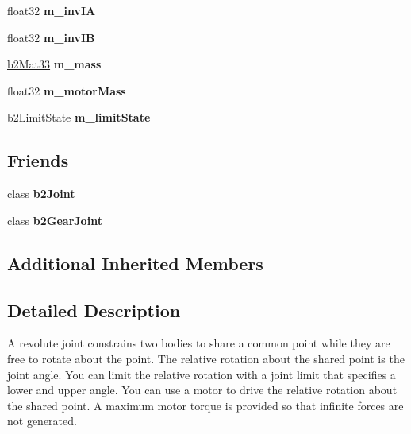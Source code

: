 \begin{DoxyCompactItemize}
\item 
float32 {\bfseries m\+\_\+inv\+IA}\hypertarget{classb2_revolute_joint_a948a49144e282f7db22b1f20379c6099}{}\label{classb2_revolute_joint_a948a49144e282f7db22b1f20379c6099}

\item 
float32 {\bfseries m\+\_\+inv\+IB}\hypertarget{classb2_revolute_joint_a7c224fc59adebaa00590217ab8a2c685}{}\label{classb2_revolute_joint_a7c224fc59adebaa00590217ab8a2c685}

\item 
\hyperlink{structb2_mat33}{b2\+Mat33} {\bfseries m\+\_\+mass}\hypertarget{classb2_revolute_joint_a284ae761074305d5032a2b666efb0650}{}\label{classb2_revolute_joint_a284ae761074305d5032a2b666efb0650}

\item 
float32 {\bfseries m\+\_\+motor\+Mass}\hypertarget{classb2_revolute_joint_aced7e455dd33ccb17a1d4ff9bb80c442}{}\label{classb2_revolute_joint_aced7e455dd33ccb17a1d4ff9bb80c442}

\item 
b2\+Limit\+State {\bfseries m\+\_\+limit\+State}\hypertarget{classb2_revolute_joint_abe77594f4773d21dabd8912d6630dc6a}{}\label{classb2_revolute_joint_abe77594f4773d21dabd8912d6630dc6a}

\end{DoxyCompactItemize}
\subsection*{Friends}
\begin{DoxyCompactItemize}
\item 
class {\bfseries b2\+Joint}\hypertarget{classb2_revolute_joint_a54ade8ed3d794298108d7f4c4e4793fa}{}\label{classb2_revolute_joint_a54ade8ed3d794298108d7f4c4e4793fa}

\item 
class {\bfseries b2\+Gear\+Joint}\hypertarget{classb2_revolute_joint_a13c275221e30bb485e17e4e04553cb71}{}\label{classb2_revolute_joint_a13c275221e30bb485e17e4e04553cb71}

\end{DoxyCompactItemize}
\subsection*{Additional Inherited Members}


\subsection{Detailed Description}
A revolute joint constrains two bodies to share a common point while they are free to rotate about the point. The relative rotation about the shared point is the joint angle. You can limit the relative rotation with a joint limit that specifies a lower and upper angle. You can use a motor to drive the relative rotation about the shared point. A maximum motor torque is provided so that infinite forces are not generated. 

